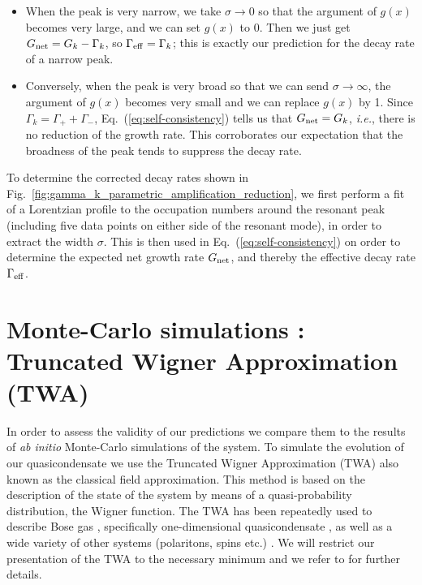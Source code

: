 \documentclass[aps,prd,notitlepage,amsfonts,amssymb,amsmath,nofootinbib,superscriptaddress,longbibliography]{revtex4-2}
\begin{document}
\begin{appendices}
\begin{itemize}
    \item When the peak is very narrow, we take $\sigma \to 0$ so that the argument of $g(x)$ becomes very large, and we can set $g(x)$ to 0.  Then we just get $G_{\rm net} = G_{k}-\Gamma_{k}$, so $\Gamma_{\rm eff} = \Gamma_{k}$; this is exactly our prediction for the decay rate of a narrow peak.
    \item Conversely, when the peak is very broad so that we can send $\sigma \to \infty$, the argument of $g(x)$ becomes very small and we can replace $g(x)$ by 1.  Since $\Gamma_{k} = \Gamma_{+}+\Gamma_{-}$, Eq.~(\ref{eq:self-consistency}) tells us that $G_{\rm net} = G_{k}$, {\it i.e.}, there is no reduction of the growth rate.  This corroborates our expectation that the broadness of the peak tends to suppress the decay rate.
\end{itemize}

To determine the corrected decay rates shown in Fig.~\ref{fig:gamma_k_parametric_amplification_reduction}, we first perform a fit of a Lorentzian profile to the occupation numbers around the resonant peak (including five data points on either side of the resonant mode), in order to extract the width $\sigma$.  This is then used in Eq.~(\ref{eq:self-consistency}) on order to determine the expected net growth rate $G_{\rm net}$, and thereby the effective decay rate $\Gamma_{\rm eff}$.




\section{Monte-Carlo simulations : Truncated Wigner Approximation (TWA)}
\label{app:TWA}

In order to assess the validity of our predictions we compare them to the results of \textit{ab initio} Monte-Carlo simulations of the system. To simulate the evolution of our quasicondensate we use the Truncated Wigner Approximation (TWA) also known as the classical field approximation. This method is based on the description of the state of the system by means of a quasi-probability distribution, the Wigner function. The TWA has been repeatedly used to describe Bose gas \cite{steelDynamicalQuantumNoise1998,Sinatra2002}, specifically one-dimensional quasicondensate \cite{Ruostekoski2013,Ruostekoski2010}, as well as a wide variety of other systems (polaritons, spins etc.) \cite{Carusotto2005,Huber2021}. We will restrict our presentation of the TWA to the necessary minimum and we refer to \cite{steelDynamicalQuantumNoise1998} for further details. 



\end{appendices}
\end{document}
